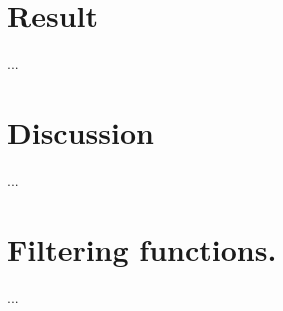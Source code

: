 \documentclass[final,5p,times,twocolumn,authoryear, draft]{elsarticle}
\begin{document}
\section{Result}
...

\section{Discussion}
...

%

\appendix

\section{Filtering functions.}
...
\end{document}
